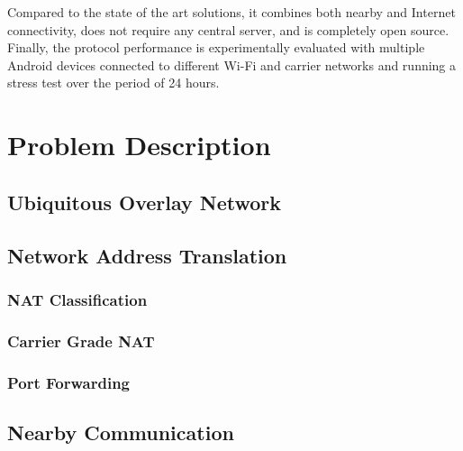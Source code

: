 Compared to the state of the art solutions, it combines both nearby and Internet connectivity, does not require any central server, and is completely open source. Finally, the protocol performance is experimentally evaluated with multiple Android devices connected to different Wi-Fi and carrier networks and running a stress test over the period of 24 hours.

\iffalse
\fi

\chapter{Problem Description}

\section{Ubiquitous Overlay Network}



\section{Network Address Translation}

\subsection{NAT Classification}

\subsection{Carrier Grade NAT}

\subsection{Port Forwarding}


\section{Nearby Communication}

